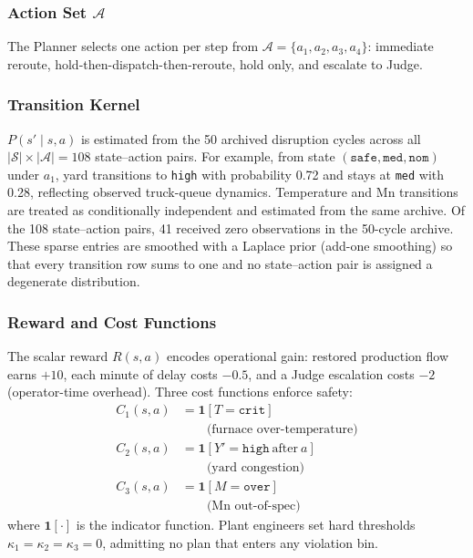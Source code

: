 \documentclass[conference]{IEEEtran}
\begin{document}
\subsubsection{Action Set \texorpdfstring{$\mathcal{A}$}{A}}
The Planner selects one action per step from $\mathcal{A} = \{a_1, a_2, a_3, a_4\}$: immediate reroute, hold-then-dispatch-then-reroute, hold only, and escalate to Judge.

\subsubsection{Transition Kernel}
$P(s' \mid s, a)$ is estimated from the 50 archived disruption cycles across all $|\mathcal{S}| \times |\mathcal{A}| = 108$ state--action pairs. For example, from state $(\texttt{safe},\texttt{med},\texttt{nom})$ under $a_1$, yard transitions to \texttt{high} with probability 0.72 and stays at \texttt{med} with 0.28, reflecting observed truck-queue dynamics. Temperature and Mn transitions are treated as conditionally independent and estimated from the same archive. Of the 108 state--action pairs, 41 received zero observations in the 50-cycle archive. These sparse entries are smoothed with a Laplace prior (add-one smoothing) so that every transition row sums to one and no state--action pair is assigned a degenerate distribution.

\subsubsection{Reward and Cost Functions}
The scalar reward $R(s, a)$ encodes operational gain: restored production flow earns $+10$, each minute of delay costs $-0.5$, and a Judge escalation costs $-2$ (operator-time overhead). Three cost functions enforce safety:
\begin{align}
  C_1(s, a) &= \mathbf{1}[T = \texttt{crit}] \label{eq:c1}\\
            &\qquad \text{(furnace over-temperature)}\nonumber\\
  C_2(s, a) &= \mathbf{1}[Y' = \texttt{high}\ \text{after}\ a] \label{eq:c2}\\
            &\qquad \text{(yard congestion)}\nonumber\\
  C_3(s, a) &= \mathbf{1}[M = \texttt{over}] \label{eq:c3}\\
            &\qquad \text{(Mn out-of-spec)}\nonumber
\end{align}
where $\mathbf{1}[\cdot]$ is the indicator function. Plant engineers set hard thresholds $\kappa_1 = \kappa_2 = \kappa_3 = 0$, admitting no plan that enters any violation bin.
\end{document}
